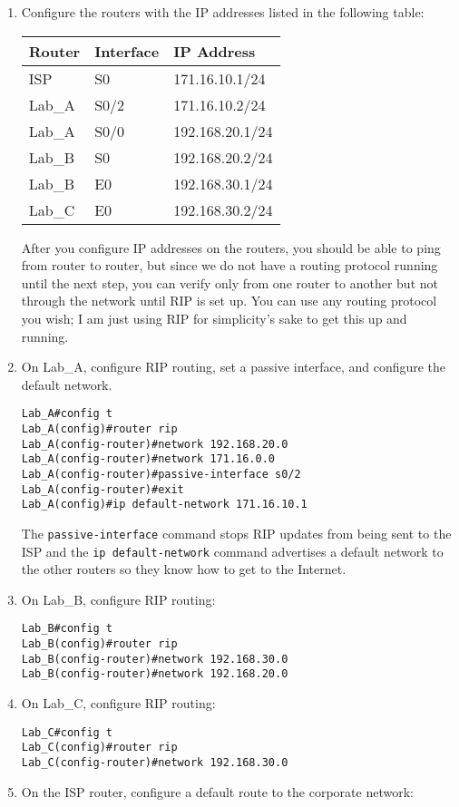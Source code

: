 \begin{enumerate}
\item
  Configure the routers with the IP addresses listed in the following
  table:

  \begin{longtable}[]{@{}lll@{}}
  \toprule
  \textbf{Router} & \textbf{Interface} & \textbf{IP
  Address}\tabularnewline
  \midrule
  \endhead
  ISP & S0 & 171.16.10.1/24\tabularnewline
  Lab\_A & S0/2 & 171.16.10.2/24\tabularnewline
  Lab\_A & S0/0 & 192.168.20.1/24\tabularnewline
  Lab\_B & S0 & 192.168.20.2/24\tabularnewline
  Lab\_B & E0 & 192.168.30.1/24\tabularnewline
  Lab\_C & E0 & 192.168.30.2/24\tabularnewline
  \bottomrule
  \end{longtable}

  After you configure IP addresses on the routers, you should be able to
  ping from router to router, but since we do not have a routing
  protocol running until the next step, you can verify only from one
  router to another but not through the network until RIP is set up. You
  can use any routing protocol you wish; I am just using RIP for
  simplicity's sake to get this up and running.
\item
  On Lab\_A, configure RIP routing, set a passive interface, and
  configure the default network.

\begin{verbatim}
Lab_A#config t
Lab_A(config)#router rip
Lab_A(config-router)#network 192.168.20.0
Lab_A(config-router)#network 171.16.0.0
Lab_A(config-router)#passive-interface s0/2
Lab_A(config-router)#exit
Lab_A(config)#ip default-network 171.16.10.1
\end{verbatim}

  The \texttt{passive-interface} command stops RIP updates from being
  sent to the ISP and the \texttt{ip\ default-network} command
  advertises a default network to the other routers so they know how to
  get to the Internet.
\item
  On Lab\_B, configure RIP routing:

\begin{verbatim}
Lab_B#config t
Lab_B(config)#router rip
Lab_B(config-router)#network 192.168.30.0
Lab_B(config-router)#network 192.168.20.0
\end{verbatim}
\item
  On Lab\_C, configure RIP routing:

\begin{verbatim}
Lab_C#config t
Lab_C(config)#router rip
Lab_C(config-router)#network 192.168.30.0
\end{verbatim}
\item
  On the ISP router, configure a default route to the corporate network:


\end{enumerate}
